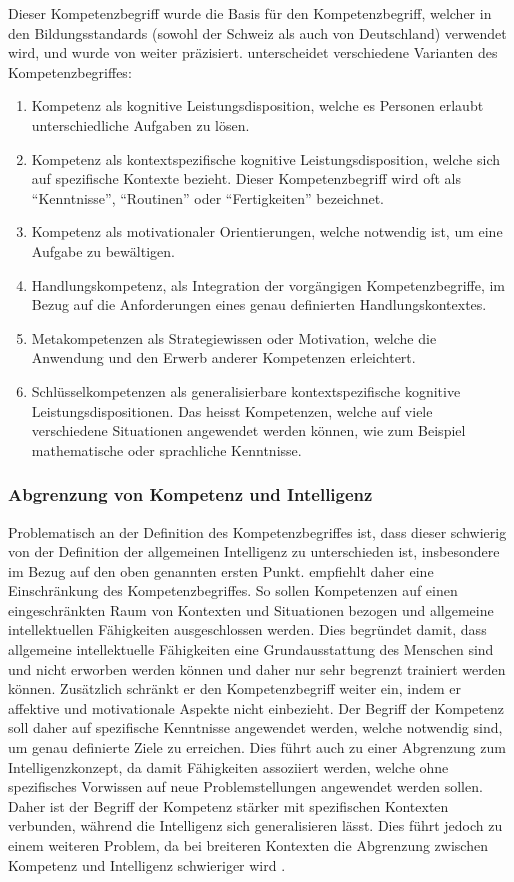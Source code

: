 Dieser Kompetenzbegriff wurde die Basis für den Kompetenzbegriff, welcher in den Bildungsstandards (sowohl der Schweiz als auch von Deutschland) verwendet wird, und wurde von \citet{Klieme2004} weiter präzisiert.
\citet{Klieme2004} unterscheidet verschiedene Varianten des Kompetenzbegriffes: 
\begin{enumerate}
\item Kompetenz als kognitive Leistungsdisposition, welche es Personen erlaubt unterschiedliche Aufgaben zu lösen.
\item Kompetenz als kontextspezifische kognitive Leistungsdisposition, welche sich auf spezifische Kontexte bezieht. Dieser Kompetenzbegriff wird oft als "`Kenntnisse"', "`Routinen"' oder "`Fertigkeiten"' bezeichnet.
\item Kompetenz als motivationaler Orientierungen, welche notwendig ist, um eine Aufgabe zu bewältigen.
\item Handlungskompetenz, als Integration der vorgängigen Kompetenzbegriffe, im Bezug auf die Anforderungen eines genau definierten Handlungskontextes.
\item Metakompetenzen als Strategiewissen oder Motivation, welche die Anwendung und den Erwerb anderer Kompetenzen erleichtert.
\item Schlüsselkompetenzen als generalisierbare kontextspezifische kognitive Leistungsdispositionen. Das heisst Kompetenzen, welche auf viele verschiedene Situationen angewendet werden können, wie zum Beispiel mathematische oder sprachliche Kenntnisse.
\end{enumerate}




\subsubsection*{Abgrenzung von Kompetenz und Intelligenz}
Problematisch an der Definition des Kompetenzbegriffes ist, dass dieser schwierig von der Definition der allgemeinen Intelligenz zu unterschieden ist, insbesondere im Bezug auf den oben genannten ersten Punkt. \citet{Weinert2001b} empfiehlt daher eine Einschränkung des Kompetenzbegriffes. So sollen Kompetenzen auf einen eingeschränkten Raum von Kontexten und Situationen bezogen und allgemeine intellektuellen Fähigkeiten ausgeschlossen werden. Dies begründet \citet{Weinert2001b} damit, dass allgemeine intellektuelle Fähigkeiten eine Grundausstattung des Menschen sind und nicht erworben werden können und daher nur sehr begrenzt trainiert werden können. Zusätzlich schränkt er den Kompetenzbegriff weiter ein, indem er affektive und motivationale Aspekte nicht einbezieht. Der Begriff der Kompetenz soll daher auf spezifische Kenntnisse angewendet werden, welche notwendig sind, um genau definierte Ziele zu erreichen. Dies führt auch zu einer Abgrenzung zum Intelligenzkonzept, da damit Fähigkeiten assoziiert werden, welche ohne spezifisches Vorwissen auf neue Problemstellungen angewendet werden sollen. Daher ist der Begriff der Kompetenz stärker mit spezifischen Kontexten verbunden, während die Intelligenz sich generalisieren lässt. Dies führt jedoch zu einem weiteren Problem, da bei breiteren Kontexten die Abgrenzung zwischen Kompetenz und Intelligenz schwieriger wird \citep{Hartig2006}.


